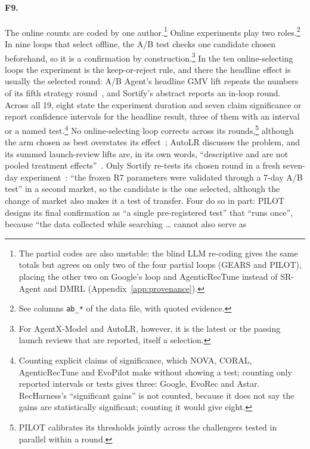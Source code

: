\documentclass[sigconf,nonacm]{acmart}
\begin{document}
\paragraph{F9.} The online counts are coded by one author.\footnote{The partial codes are also unstable: the blind LLM re-coding gives the same totals but agrees on only two of the four partial loops (GEARS and PILOT), placing the other two on Google's loop and AgenticRecTune instead of SR-Agent and DMRL (Appendix~\ref{app:provenance}).} Online experiments play
two roles.\footnote{See columns \texttt{ab\_*} of the data file, with quoted evidence.} In nine loops that select offline, the A/B
test checks one candidate chosen beforehand, so it is a confirmation by construction.\footnote{For AgentX-Model and
AutoLR, however, it is the latest or the passing launch reviews that are reported, itself a selection.} In the ten
online-selecting loops the experiment is the keep-or-reject rule, and there the headline effect is usually the
selected round: A/B Agent's headline GMV lift repeats the numbers of its fifth strategy round~\cite{jiang2026abagent},
and Sortify's abstract reports an in-loop round. Across all 19, eight state the experiment duration and seven claim
significance or report confidence intervals for the headline result, three of them with an interval or a named test.\footnote{Counting explicit claims of significance, which NOVA, CORAL, AgenticRecTune and EvoPilot make without showing a test; counting only reported intervals or tests gives three: Google, EvoRec and Astar. RecHarness's ``significant gains'' is not counted, because it does not say the gains are statistically significant; counting it would give eight.} No online-selecting loop corrects across its
rounds,\footnote{PILOT calibrates its thresholds jointly across the challengers tested in parallel within a round.} although the arm chosen as best overstates its effect~\cite{lee2018winnerscurse,berman2026winners}; AutoLR
discusses the problem, and its summed launch-review lifts are, in its own words, ``descriptive and are not pooled
treatment effects''~\cite{zhang2026autolr}. Only Sortify re-tests its chosen round in a fresh seven-day
experiment~\cite{cheng2026sortify}: ``the frozen R7 parameters were validated through a 7-day A/B test'' in a second market, so the candidate is the one selected, although the change of market also makes it a test of transfer. Four do so in part: PILOT designs its final confirmation as ``a single
pre-registered test'' that ``runs once'', because ``the data collected while searching \ldots{} cannot also serve as
\end{document}
